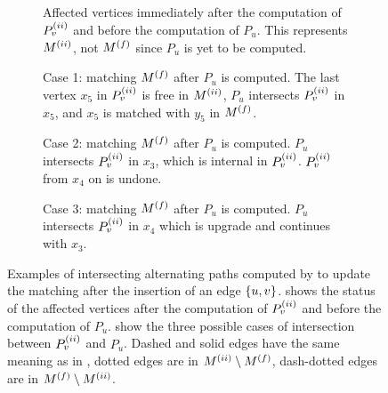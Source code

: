 \begin{figure}[tb]
\centering
\begin{subfigure}[t]{.49\textwidth}
\centering

\caption{Affected vertices immediately after the computation of $P_v^{(ii)}$
and before the computation of $P_u$. This represents $M^{(ii)}$, not
$M^{(f)}$ since $P_u$ is yet to be computed.}
\label{fig:dyn-mwm:intersect-1}
\end{subfigure}\hfill
\begin{subfigure}[t]{.49\textwidth}
\centering

\caption{Case 1: matching $M^{(f)}$ after $P_u$ is computed.
The last vertex $x_5$ in $P_v^{(ii)}$ is free in $M^{(ii)}$,
$P_u$ intersects $P_v^{(ii)}$ in $x_5$, and $x_5$ is matched with $y_5$
in $M^{(f)}$.}
\label{fig:dyn-mwm:intersect-2}
\end{subfigure}

\begin{subfigure}[t]{.49\textwidth}
\centering

\caption{Case 2: matching $M^{(f)}$ after $P_u$
is computed. $P_u$ intersects $P_v^{(ii)}$ in $x_3$, which is
internal in $P_v^{(ii)}$.
$P_v^{(ii)}$ from $x_4$ on is undone.}
\label{fig:dyn-mwm:intersect-3}
\end{subfigure}\hfill
\begin{subfigure}[t]{.49\textwidth}
\centering

\caption{Case 3: matching $M^{(f)}$ after $P_u$ is computed.
$P_u$ intersects $P_v^{(ii)}$ in $x_4$ which is upgrade and
continues with $x_3$.}
\label{fig:dyn-mwm:intersect-4}
\end{subfigure}

\caption{Examples of intersecting alternating paths computed by 
to update the matching after the insertion of an edge $\set{u, v}$.
 shows the status of the affected vertices after the
computation of $P_v^{(ii)}$ and before the computation of $P_u$.
 show the three possible
cases of intersection between $P_v^{(ii)}$ and $P_u$.
Dashed and solid edges have the same meaning as in , dotted edges
are in $M^{(ii)}\setminus M^{(f)}$, dash-dotted edges are in $M^{(f)} \setminus M^{(ii)}$.}

\label{fig:dyn-mwm:edge-insertion-intersect}
\end{figure}


